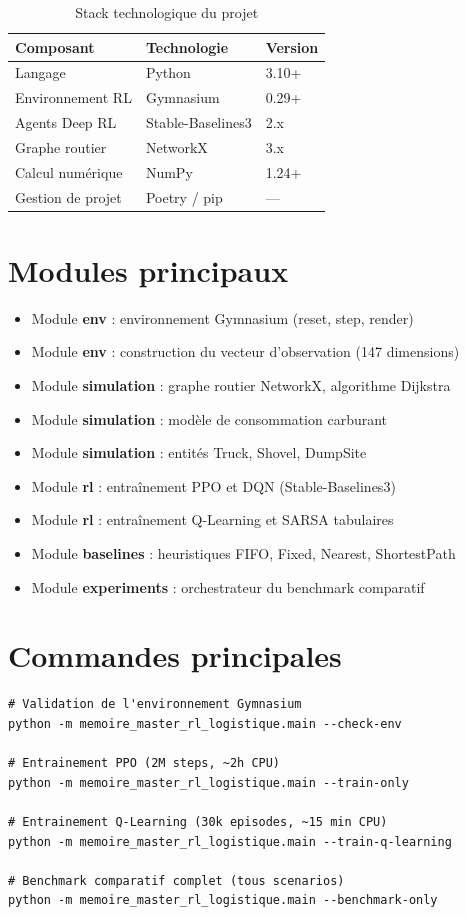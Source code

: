 \documentclass[11pt,a4paper]{report}
\begin{document}
\begin{table}[H]
\centering
\caption{Stack technologique du projet}
\begin{tabular}{lll}
\toprule
\textbf{Composant} & \textbf{Technologie} & \textbf{Version} \\
\midrule
Langage & Python & 3.10+ \\
Environnement RL & Gymnasium & 0.29+ \\
Agents Deep RL & Stable-Baselines3 & 2.x \\
Graphe routier & NetworkX & 3.x \\
Calcul numérique & NumPy & 1.24+ \\
Gestion de projet & Poetry / pip & — \\
\bottomrule
\end{tabular}
\end{table}

\section*{Modules principaux}

\begin{itemize}
    \item Module \textbf{env} : environnement Gymnasium (reset, step, render)
    \item Module \textbf{env} : construction du vecteur d'observation (147 dimensions)
    \item Module \textbf{simulation} : graphe routier NetworkX, algorithme Dijkstra
    \item Module \textbf{simulation} : modèle de consommation carburant
    \item Module \textbf{simulation} : entités Truck, Shovel, DumpSite
    \item Module \textbf{rl} : entraînement PPO et DQN (Stable-Baselines3)
    \item Module \textbf{rl} : entraînement Q-Learning et SARSA tabulaires
    \item Module \textbf{baselines} : heuristiques FIFO, Fixed, Nearest, ShortestPath
    \item Module \textbf{experiments} : orchestrateur du benchmark comparatif
\end{itemize}

\section*{Commandes principales}

\begin{lstlisting}
# Validation de l'environnement Gymnasium
python -m memoire_master_rl_logistique.main --check-env

# Entrainement PPO (2M steps, ~2h CPU)
python -m memoire_master_rl_logistique.main --train-only

# Entrainement Q-Learning (30k episodes, ~15 min CPU)
python -m memoire_master_rl_logistique.main --train-q-learning

# Benchmark comparatif complet (tous scenarios)
python -m memoire_master_rl_logistique.main --benchmark-only
\end{lstlisting}
\end{document}
